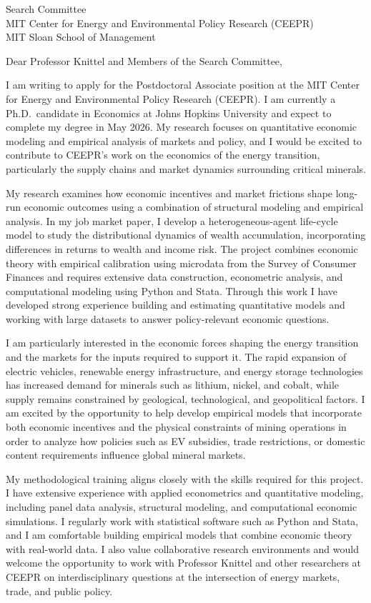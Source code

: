 \documentclass[11pt]{letter}
\begin{document}
\begin{letter}{Search Committee \\
MIT Center for Energy and Environmental Policy Research (CEEPR) \\
MIT Sloan School of Management}

\opening{Dear Professor Knittel and Members of the Search Committee,}

I am writing to apply for the Postdoctoral Associate position at the MIT Center for Energy and Environmental Policy Research (CEEPR). I am currently a Ph.D.\ candidate in Economics at Johns Hopkins University and expect to complete my degree in May 2026. My research focuses on quantitative economic modeling and empirical analysis of markets and policy, and I would be excited to contribute to CEEPR’s work on the economics of the energy transition, particularly the supply chains and market dynamics surrounding critical minerals.

My research examines how economic incentives and market frictions shape long-run economic outcomes using a combination of structural modeling and empirical analysis. In my job market paper, I develop a heterogeneous-agent life-cycle model to study the distributional dynamics of wealth accumulation, incorporating differences in returns to wealth and income risk. The project combines economic theory with empirical calibration using microdata from the Survey of Consumer Finances and requires extensive data construction, econometric analysis, and computational modeling using Python and Stata. Through this work I have developed strong experience building and estimating quantitative models and working with large datasets to answer policy-relevant economic questions.

I am particularly interested in the economic forces shaping the energy transition and the markets for the inputs required to support it. The rapid expansion of electric vehicles, renewable energy infrastructure, and energy storage technologies has increased demand for minerals such as lithium, nickel, and cobalt, while supply remains constrained by geological, technological, and geopolitical factors. I am excited by the opportunity to help develop empirical models that incorporate both economic incentives and the physical constraints of mining operations in order to analyze how policies such as EV subsidies, trade restrictions, or domestic content requirements influence global mineral markets.

My methodological training aligns closely with the skills required for this project. I have extensive experience with applied econometrics and quantitative modeling, including panel data analysis, structural modeling, and computational economic simulations. I regularly work with statistical software such as Python and Stata, and I am comfortable building empirical models that combine economic theory with real-world data. I also value collaborative research environments and would welcome the opportunity to work with Professor Knittel and other researchers at CEEPR on interdisciplinary questions at the intersection of energy markets, trade, and public policy.


\end{letter}
\end{document}
